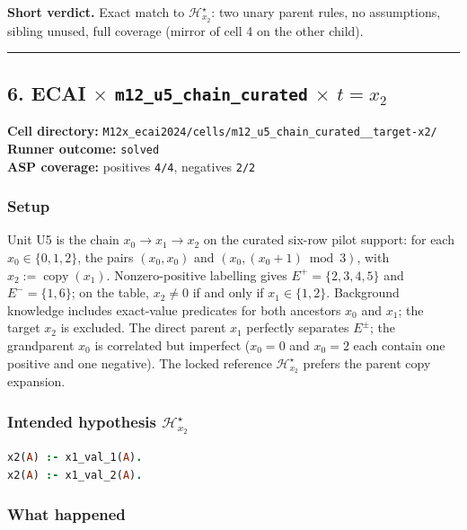 \documentclass[11pt]{article}
\begin{document}
\textbf{Short verdict.} Exact match to \(\mathcal{H}_{x_2}^\star\): two unary parent rules, no assumptions, sibling unused, full coverage (mirror of cell 4 on the other child).

\medskip\hrule\medskip

\subsection{\texorpdfstring{6. ECAI \(\times\) \texttt{m12\_u5\_chain\_curated} \(\times\) \(t=x_2\)}{6. ECAI - m12-u5-chain-curated - target x2}}

\textbf{Cell directory:} \texttt{M12x\_ecai2024/cells/m12\_u5\_chain\_curated\_\_target-x2/}\\
\textbf{Runner outcome:} \texttt{solved}\\
\textbf{ASP coverage:} positives \texttt{4/4}, negatives \texttt{2/2}

\subsubsection{Setup}

Unit U5 is the chain \(x_0\to x_1\to x_2\) on the curated six-row pilot support: for each \(x_0\in\{0,1,2\}\), the pairs \((x_0,x_0)\) and \((x_0,(x_0+1)\bmod 3)\), with \(x_2:=\operatorname{copy}(x_1)\). Nonzero-positive labelling gives \(E^+=\{2,3,4,5\}\) and \(E^-=\{1,6\}\); on the table, \(x_2\neq 0\) if and only if \(x_1\in\{1,2\}\). Background knowledge includes exact-value predicates for both ancestors \(x_0\) and \(x_1\); the target \(x_2\) is excluded. The direct parent \(x_1\) perfectly separates \(E^\pm\); the grandparent \(x_0\) is correlated but imperfect (\(x_0=0\) and \(x_0=2\) each contain one positive and one negative). The locked reference \(\mathcal{H}_{x_2}^\star\) prefers the parent copy expansion.

\subsubsection{\texorpdfstring{Intended hypothesis \(\mathcal{H}_{x_2}^\star\)}{Intended hypothesis H-star(x2)}}

\begin{lstlisting}[style=logic,language=Prolog]
x2(A) :- x1_val_1(A).
x2(A) :- x1_val_2(A).
\end{lstlisting}

\subsubsection{What happened}
\end{document}
